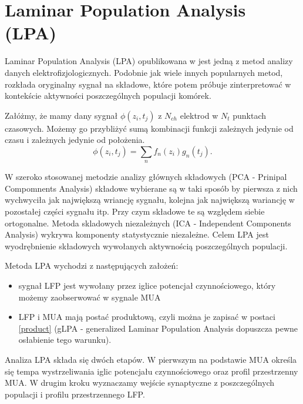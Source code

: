 \section{Laminar Population Analysis (LPA)}
Laminar Population Analysis (LPA) opublikowana w \cite{Einevoll2007} jest jedną z metod analizy danych elektrofizjologicznych. Podobnie jak wiele innych popularnych metod, rozkłada oryginalny sygnał na składowe, które potem próbuje zinterpretować w kontekście aktywności poszczególnych populacji komórek.

Załóżmy, że mamy dany sygnał $\phi(z_i, t_j)$ z $N_{ch}$ elektrod w $N_t$ punktach czasowych. Możemy go przybliżyć sumą kombinacji funkcji zależnych jedynie od czasu i zależnych jedynie od położenia.
\begin{equation}
\phi(z_i, t_j) = \sum_{n}f_n(z_i)g_n(t_j).
\label{product}
\end{equation}

W szeroko stosowanej metodzie analizy głównych składowych (PCA - Prinipal Compomnents Analysis) składowe wybierane są w taki sposób by pierwsza z nich wychwyciła jak największą wriancję sygnału, kolejna jak największą wariancję w pozostałej części sygnału itp. Przy czym składowe te są względem siebie ortogonalne. Metoda skladowych niezależnych (ICA - Independent Components Analysis) wykrywa komponenty statystycznie niezależne. Celem LPA jest wyodrębnienie składowych wywołanych aktywnością poszczególnych populacji. 

Metoda LPA wychodzi z następujących założeń:
\begin{itemize}
\item sygnał LFP jest wywołany przez iglice potencjał czynnościowego, który możemy zaobserwować w sygnale MUA
\item LFP i MUA mają postać produktową, czyli można je zapisać w postaci \ref{product} (gLPA - generalized Laminar Population Analysis dopuszcza pewne osłabienie tego warunku).
\end{itemize}

Analiza LPA składa się dwóch etapów. W pierwszym na podstawie MUA określa się tempa wystrzeliwania iglic potencjału czynnościowego oraz profil przestrzenny MUA. W drugim kroku wyznaczamy wejście synaptyczne z poszczególnych populacji i profilu przestrzennego LFP.

